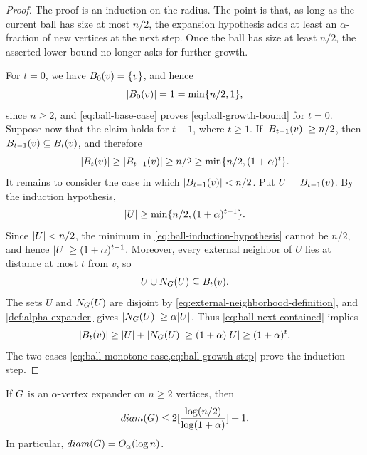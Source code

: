 \begin{proof}
	The proof is an induction on the radius. The point is that, as long as the current ball has size at most \(n/2\), the expansion hypothesis adds at least an \(\alpha\)-fraction of new vertices at the next step. Once the ball has size at least \(n/2\), the asserted lower bound no longer asks for further growth.

	For \(t=0\), we have \(B_0(v)=\{v\}\), and hence
	\begin{equation}
		\label{eq:ball-base-case}
		\lvert B_0(v)\rvert=1=\min\{n/2,1\},
	\end{equation}
	since \(n\geq 2\), and \cref{eq:ball-base-case} proves \cref{eq:ball-growth-bound} for \(t=0\). Suppose now that the claim holds for \(t-1\), where \(t\geq 1\). If \(\lvert B_{t-1}(v)\rvert\geq n/2\), then \(B_{t-1}(v)\subseteq B_t(v)\), and therefore
	\begin{equation}
		\label{eq:ball-monotone-case}
		\lvert B_t(v)\rvert\geq \lvert B_{t-1}(v)\rvert\geq n/2\geq \min\{n/2,(1+\alpha)^t\}.
	\end{equation}
	It remains to consider the case in which \(\lvert B_{t-1}(v)\rvert<n/2\). Put \(U=B_{t-1}(v)\). By the induction hypothesis,
	\begin{equation}
		\label{eq:ball-induction-hypothesis}
		\lvert U\rvert\geq \min\{n/2,(1+\alpha)^{t-1}\}.
	\end{equation}
	Since \(\lvert U\rvert<n/2\), the minimum in \cref{eq:ball-induction-hypothesis} cannot be \(n/2\), and hence \(\lvert U\rvert\geq (1+\alpha)^{t-1}\). Moreover, every external neighbor of \(U\) lies at distance at most \(t\) from \(v\), so
	\begin{equation}
		\label{eq:ball-next-contained}
		U\cup N_{G}(U)\subseteq B_t(v).
	\end{equation}
	The sets \(U\) and \(N_{G}(U)\) are disjoint by \cref{eq:external-neighborhood-definition}, and \cref{def:alpha-expander} gives \(\lvert N_{G}(U)\rvert\geq \alpha\lvert U\rvert\). Thus \cref{eq:ball-next-contained} implies
	\begin{equation}
		\label{eq:ball-growth-step}
		\lvert B_t(v)\rvert\geq \lvert U\rvert+\lvert N_{G}(U)\rvert\geq (1+\alpha)\lvert U\rvert\geq (1+\alpha)^t.
	\end{equation}
	The two cases \cref{eq:ball-monotone-case,eq:ball-growth-step} prove the induction step.
\end{proof}

\begin{corollary}
	\label{cor:logarithmic-diameter}
	If \(G\) is an \(\alpha\)-vertex expander on \(n\geq 2\) vertices, then
	\begin{equation}
		\label{eq:diameter-bound}
		\operatorname{diam}(\Graph)\leq 2\left\lceil\frac{\log(n/2)}{\log(1+\alpha)}\right\rceil+1.
	\end{equation}
	In particular, \(\operatorname{diam}(\Graph)=O_\alpha(\log n)\).
\end{corollary}

